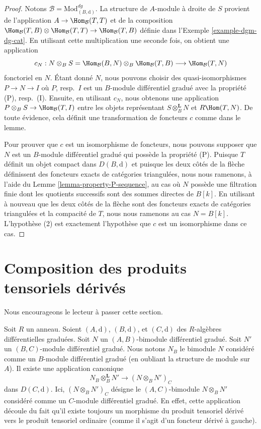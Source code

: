 \begin{proof}
Notons $\mathcal{B} = \text{Mod}^{dg}_{(B, \text{d})}$. La structure de $A$-module à
droite de $S$ provient de l'application $A \to \Hom_\mathcal{B}(T, T)$ et de
la composition $\Hom_\mathcal{B}(T, B) \otimes \Hom_\mathcal{B}(T, T) \to
\Hom_\mathcal{B}(T, B)$ définie dans l'Exemple \ref{example-dgm-dg-cat}. En
utilisant cette multiplication une seconde fois, on obtient une application
$$
c_N :
N \otimes_B S = \Hom_\mathcal{B}(B, N) \otimes_B \Hom_\mathcal{B}(T, B)
\longrightarrow
\Hom_\mathcal{B}(T, N)
$$
fonctoriel en $N$. Étant donné $N$, nous pouvons choisir des quasi-isomorphismes
$P \to N \to I$ où $P$, resp.\ $I$ est un $B$-module différentiel gradué avec la
propriété (P), resp.\ (I). Ensuite, en utilisant $c_N$, nous obtenons une
application $P \otimes_B S \to \Hom_\mathcal{B}(T, I)$ entre les objets
représentant $S \otimes_B^\mathbf{L} N$ et $R\Hom(T, N)$. De toute évidence, cela
définit une transformation de foncteurs $c$ comme dans le lemme.

\medskip\noindent
Pour prouver que $c$ est un isomorphisme de foncteurs, nous pouvons supposer que
$N$ est un $B$-module différentiel gradué qui possède la propriété (P). Puisque
$T$ définit un objet compact dans $D(B, \text{d})$ et puisque les deux côtés de la
flèche définissent des foncteurs exacts de catégories triangulées, nous nous ramenons,
à l'aide du Lemme \ref{lemma-property-P-sequence}, au cas où $N$ possède une
filtration finie dont les quotients successifs sont des sommes directes de $B[k]$. En
utilisant à nouveau que les deux côtés de la flèche sont des foncteurs exacts de
catégories triangulées et la compacité de $T$, nous nous ramenons au cas $N = B[k]$.
L'hypothèse (2) est exactement l'hypothèse que $c$ est un isomorphisme dans ce
cas.
\end{proof}






\section{Composition des produits tensoriels dérivés}
\label{section-compose-tensor-functors}

\noindent
Nous encourageons le lecteur à passer cette section.

\medskip\noindent
Soit $R$ un anneau. Soient $(A, \text{d})$, $(B, \text{d})$, et $(C, \text{d})$
des $R$-algèbres différentielles graduées. Soit $N$ un $(A, B)$-bimodule
différentiel gradué. Soit $N'$ un $(B, C)$-module différentiel gradué. Nous notons
$N_B$ le bimodule $N$ considéré comme un $B$-module différentiel gradué (en
oubliant la structure de module sur $A$). Il existe une application canonique
\begin{equation}
\label{equation-plain-versus-derived}
N_B \otimes_B^\mathbf{L} N'
\longrightarrow
(N \otimes_B N')_C
\end{equation}
dans $D(C, \text{d})$. Ici, $(N \otimes_B N')_C$ désigne le $(A, C)$-bimodule $N
\otimes_B N'$ considéré comme un $C$-module différentiel gradué. En effet, cette
application découle du fait qu'il existe toujours un morphisme du produit tensoriel dérivé vers
le produit tensoriel ordinaire (comme il s'agit d'un foncteur dérivé à gauche).

